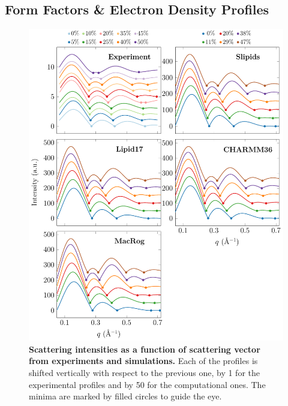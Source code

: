 \documentclass[journal=jpcbfk]{achemso}
\begin{document}
\subsection{Form Factors \& Electron Density Profiles}

\begin{figure}[htb!]
    \centering
    \includegraphics[width=0.86\linewidth]{../FIGS/scattering.pdf}
    \caption{\label{SIfig:scattering}%
     \textbf{Scattering intensities as a function of scattering vector from experiments and simulations.} Each of the profiles is shifted vertically with respect to the previous one, by 1 for the experimental profiles and by 50 for the computational ones. The minima are marked by filled circles to guide the eye.
    }
\end{figure}
\end{document}
